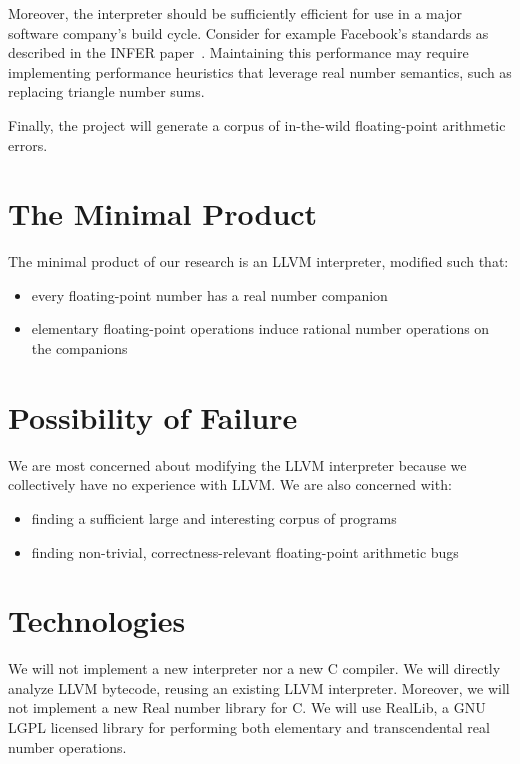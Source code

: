 \documentclass[preprint, authoryear]{sigplanconf}
\begin{document}
Moreover, the interpreter should be sufficiently efficient for use in a major
software company's build cycle. Consider for example Facebook's standards as
described in the INFER paper~\cite{infer}. Maintaining this performance may
require implementing performance heuristics that leverage real number semantics,
such as replacing triangle number sums.

Finally, the project will generate a corpus of in-the-wild floating-point
arithmetic errors.

\section{The Minimal Product}

The minimal product of our research is an LLVM interpreter, modified such that:

\begin{itemize}
\item every floating-point number has a real number companion
\item elementary floating-point operations induce rational number operations on the
  companions
\end{itemize}

\section{Possibility of Failure}

We are most concerned about modifying the LLVM interpreter because we
collectively have no experience with LLVM. We are also concerned with:

\begin{itemize}
\item finding a sufficient large and interesting corpus of programs
\item finding non-trivial, correctness-relevant floating-point arithmetic bugs
\end{itemize}

\section{Technologies}

We will not implement a new interpreter nor a new C compiler. We will directly
analyze LLVM bytecode, reusing an existing LLVM interpreter. Moreover, we will
not implement a new Real number library for C. We will use RealLib, a GNU LGPL
licensed library for performing both elementary and transcendental real number
operations.
\end{document}
